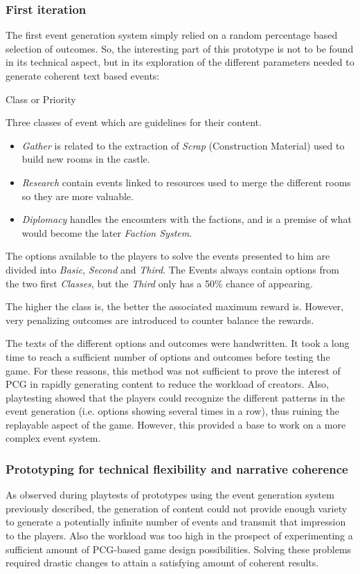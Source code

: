 \subsubsection{First iteration}
The first event generation system simply relied on a random percentage based selection of outcomes. So, the interesting part of this prototype is not to be found in its technical aspect, but in its exploration of the different parameters needed to generate coherent text based events:
\begin{labeling}{Class or Priority}
\item[\textbf{Event Type}] Three classes of event which are guidelines for their content.
\begin{itemize}
\item \textit{Gather} is related to the extraction of \textit{Scrap} (Construction Material) used to build new rooms in the castle.
\item \textit{Research} contain events linked to resources  used to merge the different rooms so they are more valuable.
\item \textit{Diplomacy} handles the encounters with the factions, and is a premise of what would become the later \textit{Faction System}.
\end{itemize}
\item[\textbf{Option Class}] The options available to the players to solve the events presented to him are divided into \textit{Basic}, \textit{Second} and \textit{Third}. The Events always contain options from the two first \textit{Classes}, but the \textit{Third} only has a 50\% chance of appearing. 
\item[\textbf{Risk}] The higher the class is, the better the associated maximum reward is. However, very penalizing outcomes are introduced to counter balance the rewards.
\end{labeling}
The texts of the different options and outcomes were handwritten. It took a long time to reach a sufficient number of options and outcomes before testing the game. For these reasons, this method was not sufficient to prove the interest of PCG in rapidly generating content to reduce the workload of creators. Also, playtesting showed that the players could recognize the different patterns in the event generation (i.e. options showing several times in a row), thus ruining the replayable aspect of the game. However, this provided a base to work on a more complex event system.
\subsubsection{Prototyping for technical flexibility and narrative coherence}
As observed during playtests of prototypes using the event generation system previously described, the generation of content could not provide enough variety to generate a potentially infinite number of events and transmit that impression to the players. Also the workload was too high in the prospect of experimenting a sufficient amount of PCG-based game design possibilities. Solving these problems required drastic changes to attain a satisfying amount of coherent results.

